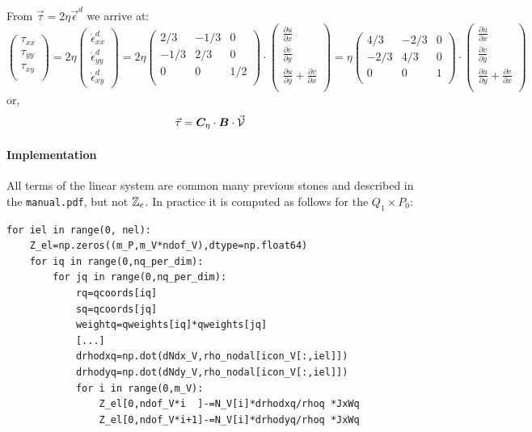 From $\vec{\tau} = 2\eta \vec{\epsilon}^d$ we arrive at:
\[
\left(
\begin{array}{c}
\tau_{xx}\\
\tau_{yy}\\
\tau_{xy}\\
\end{array}
\right)
=
2\eta
\left(
\begin{array}{c}
\dot{\epsilon}_{xx}^d \\
\dot{\epsilon}_{yy}^d \\
\dot{\epsilon}_{xy}^d 
\end{array}
\right)
=2 \eta
\left(
\begin{array}{ccc}
2/3 & -1/3& 0 \\
-1/3 & 2/3 & 0 \\
0 & 0 & 1/2 \\
\end{array}
\right)
\cdot 
\left(
\begin{array}{c}
\frac{\partial u}{\partial x} \\ 
\frac{\partial v}{\partial y} \\ 
\frac{\partial u}{\partial y}\! +\! \frac{\partial v}{\partial x} \\
\end{array}
\right)
=
\eta
\left(
\begin{array}{ccc}
4/3 & -2/3& 0 \\
-2/3 & 4/3 & 0 \\
0 & 0 & 1 \\
\end{array}
\right)
\cdot 
\left(
\begin{array}{c}
\frac{\partial u}{\partial x} \\ 
\frac{\partial v}{\partial y} \\ 
\frac{\partial u}{\partial y}\! +\! \frac{\partial v}{\partial x} \\
\end{array}
\right)
\]
or, 
\[
\vec{\tau} = {\bm C}_\eta\cdot {\bm B} \cdot \vec{\cal V}
\]


\paragraph{Implementation} 
All terms of the linear system are common many previous stones and described in 
the {\tt manual.pdf}, but not ${\mathbb{Z}}_e$.
In practice it is computed as follows for the $Q_1\times P_0$:

\begin{lstlisting}
for iel in range(0, nel):
    Z_el=np.zeros((m_P,m_V*ndof_V),dtype=np.float64)
    for iq in range(0,nq_per_dim):
        for jq in range(0,nq_per_dim):
            rq=qcoords[iq]
            sq=qcoords[jq]
            weightq=qweights[iq]*qweights[jq]
            [...]
            drhodxq=np.dot(dNdx_V,rho_nodal[icon_V[:,iel]])
            drhodyq=np.dot(dNdy_V,rho_nodal[icon_V[:,iel]])
            for i in range(0,m_V):
                Z_el[0,ndof_V*i  ]-=N_V[i]*drhodxq/rhoq *JxWq 
                Z_el[0,ndof_V*i+1]-=N_V[i]*drhodyq/rhoq *JxWq 
\end{lstlisting}


